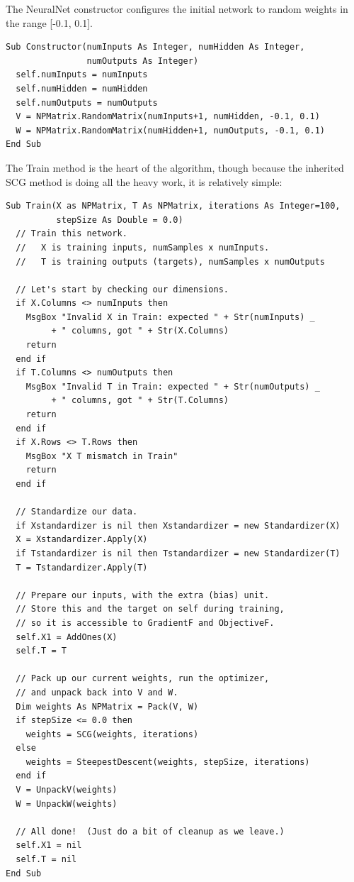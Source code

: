 \documentclass{article}
\begin{document}
The NeuralNet constructor configures the initial network to random weights in the range [-0.1, 0.1].

\begin{lstlisting}
Sub Constructor(numInputs As Integer, numHidden As Integer, 
                numOutputs As Integer)
  self.numInputs = numInputs
  self.numHidden = numHidden
  self.numOutputs = numOutputs
  V = NPMatrix.RandomMatrix(numInputs+1, numHidden, -0.1, 0.1)
  W = NPMatrix.RandomMatrix(numHidden+1, numOutputs, -0.1, 0.1)
End Sub
\end{lstlisting}

The Train method is the heart of the algorithm, though because the inherited SCG method is doing all the heavy work, it is relatively simple:

\begin{lstlisting}
Sub Train(X as NPMatrix, T As NPMatrix, iterations As Integer=100, 
          stepSize As Double = 0.0)
  // Train this network.
  //   X is training inputs, numSamples x numInputs.
  //   T is training outputs (targets), numSamples x numOutputs
  
  // Let's start by checking our dimensions.
  if X.Columns <> numInputs then
    MsgBox "Invalid X in Train: expected " + Str(numInputs) _
         + " columns, got " + Str(X.Columns)
    return
  end if
  if T.Columns <> numOutputs then
    MsgBox "Invalid T in Train: expected " + Str(numOutputs) _
         + " columns, got " + Str(T.Columns)
    return
  end if
  if X.Rows <> T.Rows then
    MsgBox "X T mismatch in Train"
    return
  end if
  
  // Standardize our data.
  if Xstandardizer is nil then Xstandardizer = new Standardizer(X)
  X = Xstandardizer.Apply(X)
  if Tstandardizer is nil then Tstandardizer = new Standardizer(T)
  T = Tstandardizer.Apply(T)
  
  // Prepare our inputs, with the extra (bias) unit.
  // Store this and the target on self during training,
  // so it is accessible to GradientF and ObjectiveF.
  self.X1 = AddOnes(X)
  self.T = T
  
  // Pack up our current weights, run the optimizer,
  // and unpack back into V and W.
  Dim weights As NPMatrix = Pack(V, W)
  if stepSize <= 0.0 then
    weights = SCG(weights, iterations)
  else
    weights = SteepestDescent(weights, stepSize, iterations)
  end if
  V = UnpackV(weights)
  W = UnpackW(weights)
  
  // All done!  (Just do a bit of cleanup as we leave.)
  self.X1 = nil
  self.T = nil
End Sub
\end{lstlisting}
\end{document}
